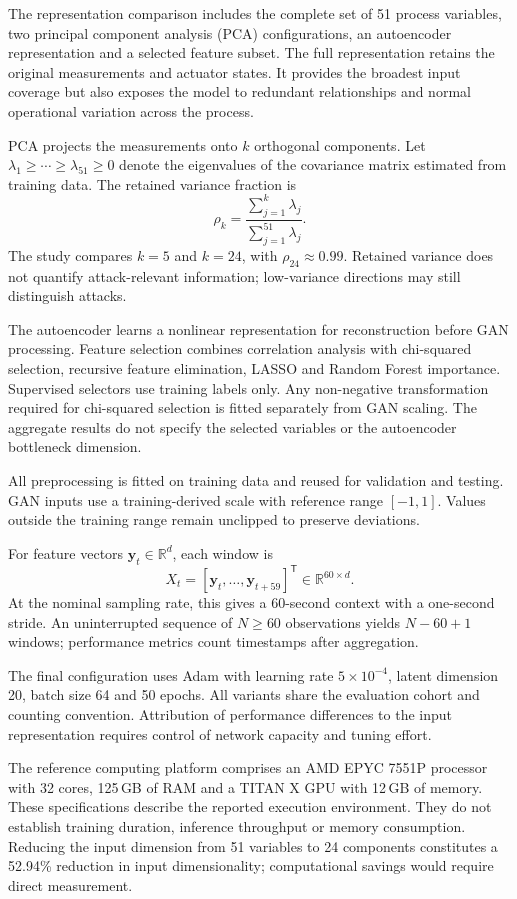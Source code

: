 The representation comparison includes the complete set of 51 process variables, two principal
component analysis (PCA) configurations, an autoencoder representation and a selected feature
subset. The full representation retains the original measurements and actuator states. It
provides the broadest input coverage but also exposes the model to redundant relationships and
normal operational variation across the process.

PCA projects the measurements onto $k$ orthogonal components. Let
$\lambda_1\geq\cdots\geq\lambda_{51}\geq0$ denote the eigenvalues of the covariance matrix
estimated from training data. The retained variance fraction is
\[
  \rho_k=\frac{\sum_{j=1}^{k}\lambda_j}{\sum_{j=1}^{51}\lambda_j}.
\]
The study compares $k=5$ and $k=24$, with $\rho_{24}\approx0.99$. Retained variance does not
quantify attack-relevant information; low-variance directions may still distinguish attacks.

The autoencoder learns a nonlinear representation for reconstruction before GAN processing.
Feature selection combines correlation analysis with chi-squared selection, recursive feature
elimination, LASSO and Random Forest importance. Supervised selectors use training labels only.
Any non-negative transformation required for chi-squared selection is fitted separately from GAN scaling.
The aggregate results do not specify the selected variables or the autoencoder bottleneck dimension.

All preprocessing is fitted on training data and reused for validation and testing. GAN inputs
use a training-derived scale with reference range $[-1,1]$. Values outside the training range
remain unclipped to preserve deviations.

For feature vectors $\mathbf{y}_t\in\mathbb{R}^{d}$, each window is
\[
  X_t=[\mathbf{y}_t,\ldots,\mathbf{y}_{t+59}]^{\mathsf T}
  \in\mathbb{R}^{60\times d}.
\]
At the nominal sampling rate, this gives a 60-second context with a one-second stride.
An uninterrupted sequence of $N\geq60$ observations yields
$N-60+1$ windows; performance metrics count timestamps after aggregation.

The final configuration uses Adam with learning rate $5\times10^{-4}$, latent dimension 20,
batch size 64 and 50 epochs. All variants share the evaluation cohort and counting convention.
Attribution of performance differences to the input representation requires control of network
capacity and tuning effort.

The reference computing platform comprises an AMD EPYC 7551P processor with 32 cores, 125\,GB of
RAM and a TITAN X GPU with 12\,GB of memory. These specifications describe the reported execution
environment. They do not establish training duration, inference throughput or memory
consumption. Reducing the input dimension from 51 variables to 24 components constitutes a
52.94\% reduction in input dimensionality; computational savings would require direct
measurement.

